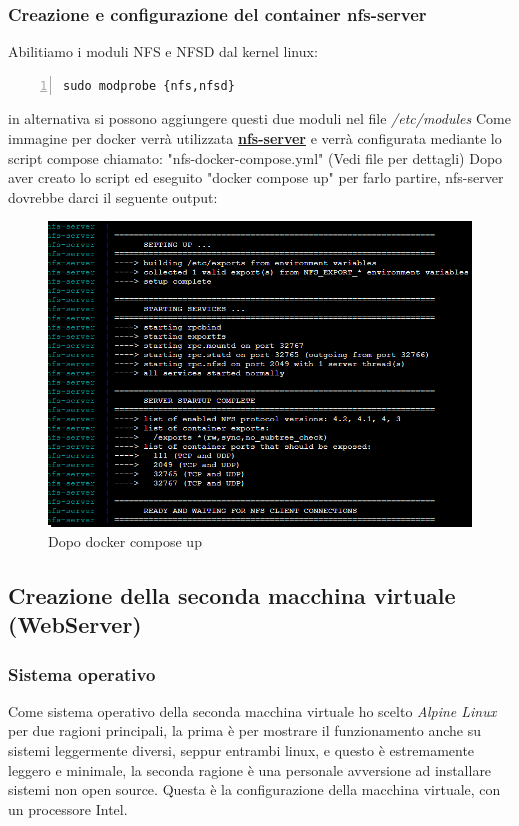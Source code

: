\documentclass[a4paper]{article}
\begin{document}
\subsubsection{Creazione e configurazione del container nfs-server}
Abilitiamo i moduli NFS e NFSD dal kernel linux:
\begin{Verbatim}[numbers=left,breaklines]
    sudo modprobe {nfs,nfsd}
\end{Verbatim}
in alternativa si possono aggiungere questi due moduli nel file \textit{/etc/modules}
Come immagine per docker verrà utilizzata \href{https://hub.docker.com/r/erichough/nfs-server/}{\textbf{nfs-server}}
e verrà configurata mediante lo script compose chiamato: "nfs-docker-compose.yml" (Vedi file per dettagli)
Dopo aver creato lo script ed eseguito "docker compose up" per farlo partire, nfs-server dovrebbe darci il seguente output:
\begin{figure}[H]
    \centering
    \includegraphics[scale=0.30]{images/NFSSettato.png}
    \caption{Dopo docker compose up}
\end{figure}

\subsection{Creazione della seconda macchina virtuale (WebServer)}
\subsubsection{Sistema operativo}
Come sistema operativo della seconda macchina virtuale ho scelto \textit{Alpine Linux} per due ragioni principali, la prima
è per mostrare il funzionamento anche su sistemi leggermente diversi, seppur entrambi linux, e questo è estremamente leggero e minimale,
la seconda ragione è una personale avversione ad installare sistemi non open source. Questa è la configurazione della macchina virtuale,
con un processore Intel.
\end{document}
